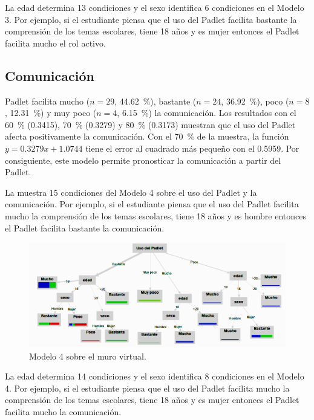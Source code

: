 \documentclass[spanish]{textolivre}
\begin{document}
La edad determina 13 condiciones y el sexo identifica 6 condiciones en el Modelo 3. Por ejemplo, si el estudiante piensa que el uso del Padlet facilita bastante la comprensión de los temas escolares, tiene 18 años y es mujer entonces el Padlet facilita mucho el rol activo.

\subsection{Comunicación}\label{sec-resumo}
Padlet facilita mucho ($n = 29$, 44.62~\%), bastante ($n = 24$, 36.92~\%), poco ($n = 8$, 12.31~\%) y muy poco ($n = 4$, 6.15~\%) la comunicación. Los resultados con el 60~\% (0.3415), 70~\% (0.3279) y 80~\% (0.3173) muestran que el uso del Padlet afecta positivamente la comunicación. Con el 70~\% de la muestra, la función $y = 0.3279x + 1.0744$ tiene el error al cuadrado más pequeño con el 0.5959. Por consiguiente, este modelo permite pronosticar la comunicación a partir del Padlet. 

La  muestra 15 condiciones del Modelo 4 sobre el uso del Padlet y la comunicación. Por ejemplo, si el estudiante piensa que el uso del Padlet facilita mucho la comprensión de los temas escolares, tiene 18 años y es hombre entonces el Padlet facilita bastante la comunicación.

\begin{figure}[h]
\centering
\begin{minipage}{.85\textwidth}
    \includegraphics[width=\linewidth]{Fig6.png}
    \caption{Modelo 4 sobre el muro virtual.}
    \label{fig6}
\end{minipage}
\end{figure}

La edad determina 14 condiciones y el sexo identifica 8 condiciones en el Modelo 4. Por ejemplo, si el estudiante piensa que el uso del Padlet facilita mucho la comprensión de los temas escolares, tiene 18 años y es mujer entonces el Padlet facilita mucho la comunicación.
\end{document}
